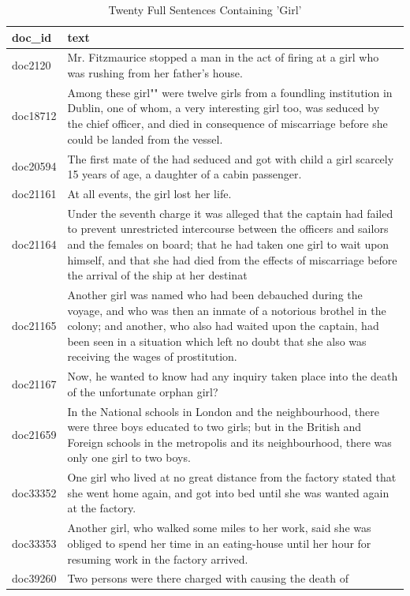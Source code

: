\documentclass[
]{article}
\begin{document}
\begin{longtable}[t]{ll}
\caption{\label{tab:girl_sentences_table}Twenty Full Sentences Containing 'Girl'}\\
\toprule
doc\_id & text\\
\midrule
doc2120 & Mr. Fitzmaurice stopped a man in the act of firing at a girl
who was rushing from her father's house.\\
doc18712 & Among these girl"" were twelve girls from a foundling
institution in Dublin, one of whom, a very interesting
girl too, was seduced by the chief officer, and died in
consequence of miscarriage before she could be landed from
the vessel.\\
doc20594 & The first mate of the had seduced and got with child a girl
scarcely 15 years of age, a daughter of a cabin passenger.\\
doc21161 & At all events, the girl lost her life.\\
doc21164 & Under the seventh charge it was alleged that the captain
had failed to prevent unrestricted intercourse between the
officers and sailors and the females on board; that he had
taken one girl to wait upon himself, and that she had died
from the effects of miscarriage before the arrival of the
ship at her destinat\\
\addlinespace
doc21165 & Another girl was named who had been debauched during the
voyage, and who was then an inmate of a notorious brothel
in the colony; and another, who also had waited upon the
captain, had been seen in a situation which left no doubt
that she also was receiving the wages of prostitution.\\
doc21167 & Now, he wanted to know had any inquiry taken place into the
death of the unfortunate orphan girl?\\
doc21659 & In the National schools in London and the neighbourhood,
there were three boys educated to two girls; but in the
British and Foreign schools in the metropolis and its
neighbourhood, there was only one girl to two boys.\\
doc33352 & One girl who lived at no great distance from the factory
stated that she went home again, and got into bed until she
was wanted again at the factory.\\
doc33353 & Another girl, who walked some miles to her work, said she
was obliged to spend her time in an eating-house until her
hour for resuming work in the factory arrived.\\
\addlinespace
doc39260 & Two persons were there charged with causing the death of

\end{longtable}
\end{document}
